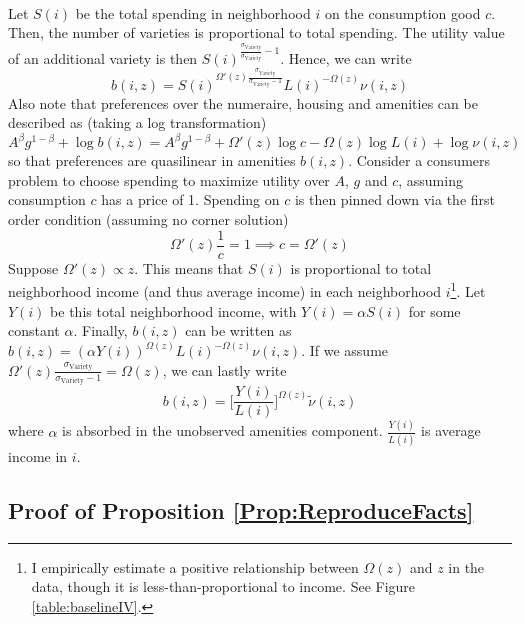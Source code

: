\documentclass[12pt]{article}
\begin{document}
	\paragraph*{}
	Let $S(i)$ be the total spending in neighborhood $i$ on the consumption good $c$. Then, the number of varieties is proportional to total spending. The utility value of an additional variety is then $S(i)^{\frac{\sigma_{\text{Variety}}}{\sigma_{\text{Variety}}} - 1}$. Hence, we can write 
	$$b(i, z) = S(i)^{\Omega'(z)\frac{\sigma_{\text{Variety}}}{\sigma_{\text{Variety}}-1}}L(i)^{-\Omega(z)}\nu(i,z)$$ Also note that preferences over the numeraire, housing and amenities can be described as (taking a log transformation) $$A^{\beta}g^{1-\beta} + \log b(i, z) = A^{\beta}g^{1-\beta} +  \Omega'(z)\log c - \Omega(z)\log L(i) + \log \nu(i, z) $$ so that preferences are quasilinear in amenities $b(i, z)$. Consider a consumers problem to choose spending to maximize utility over $A$, $g$ and $c$, assuming consumption $c$ has a price of 1. Spending on $c$ is then pinned down via the first order condition (assuming no corner solution) $$\Omega'(z)\frac{1}{c} = 1 \implies c = \Omega'(z)$$ Suppose $\Omega'(z) \propto z$. This means that $S(i)$ is proportional to total neighborhood income (and thus average income) in each neighborhood $i$\footnote{I empirically estimate a positive relationship between $\Omega(z)$ and $z$ in the data, though it is less-than-proportional to income. See Figure \ref{table:baselineIV}. }. Let $Y(i)$ be this total neighborhood income, with $Y(i) = \alpha S(i)$ for some constant $\alpha$. Finally, $b(i, z)$ can be written as $b(i, z) = (\alpha Y(i))^{\Omega(z)}L(i)^{-\Omega(z)}\nu(i, z)$. If we assume $\Omega'(z)\frac{\sigma_{\text{Variety}}}{\sigma_{\text{Variety}} - 1} = \Omega(z)$, we can lastly write
	$$b(i, z) =  \big[\frac{Y(i)}{L(i)}\big]^{\Omega(z)}\tilde{\nu}(i, z)$$ where $\alpha$ is absorbed in the unobserved amenities component. $\frac{Y(i)}{L(i)}$ is average income in $i$.
	
	\clearpage
	\subsection{Proof of Proposition \ref{Prop:ReproduceFacts}}\label{Proof:ReproduceFacts}
\end{document}
